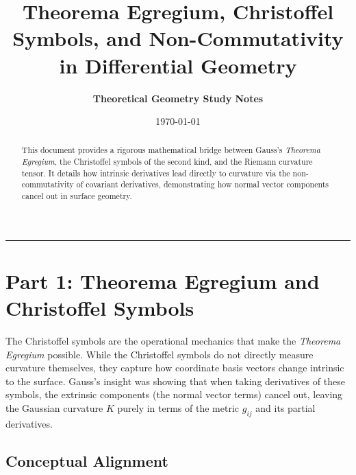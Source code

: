 \documentclass[11pt,a4paper]{article}
\title{\textbf{\Large Theorema Egregium, Christoffel Symbols, and Non-Commutativity in Differential Geometry}}
\author{\textbf{Theoretical Geometry Study Notes}}
\date{\today}
\begin{document}
	
	\maketitle
	
	\begin{abstract}
		This document provides a rigorous mathematical bridge between Gauss's \emph{Theorema Egregium}, the Christoffel symbols of the second kind, and the Riemann curvature tensor. It details how intrinsic derivatives lead directly to curvature via the non-commutativity of covariant derivatives, demonstrating how normal vector components cancel out in surface geometry.
	\end{abstract}
	
	\hrule
	\vspace{1.5em}
	
	\section{Part 1: Theorema Egregium and Christoffel Symbols}
	
	The Christoffel symbols are the operational mechanics that make the \emph{Theorema Egregium} possible. While the Christoffel symbols do not directly measure curvature themselves, they capture how coordinate basis vectors change intrinsic to the surface. Gauss's insight was showing that when taking derivatives of these symbols, the extrinsic components (the normal vector terms) cancel out, leaving the Gaussian curvature $K$ purely in terms of the metric $g_{ij}$ and its partial derivatives.
	
	\subsection{Conceptual Alignment}
	
\end{document}
